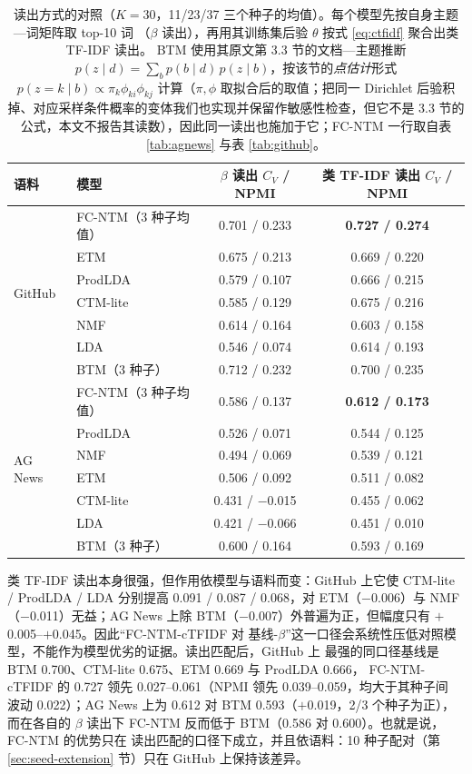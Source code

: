 \documentclass[11pt]{ctexart}
\newcommand{\fcntm}{FC-NTM}
\begin{document}
\begin{table}[t]
\centering
\caption{读出方式的对照（$K=30$，11/23/37 三个种子的均值）。每个模型先按自身主题—词矩阵取 top-10 词
（$\beta$ 读出），再用其训练集后验 $\theta$ 按式 \eqref{eq:ctfidf} 聚合出类 TF-IDF 读出。
BTM 使用其原文第 3.3 节的文档—主题推断
$p(z\mid d)=\sum_b p(b\mid d)\,p(z\mid b)$，按该节的\emph{点估计}形式
$p(z=k\mid b)\propto\pi_k\phi_{ki}\phi_{kj}$ 计算（$\pi,\phi$ 取拟合后的取值；把同一
Dirichlet 后验积掉、对应采样条件概率的变体我们也实现并保留作敏感性检查，但它不是 3.3 节的
公式，本文不报告其读数），因此同一读出也施加于它；\fcntm{} 一行取自表 \ref{tab:agnews}
与表 \ref{tab:github}。}
\label{tab:fair}
\footnotesize
\setlength{\tabcolsep}{4pt}
\begin{tabular}{@{}llcc@{}}
\toprule
语料 & 模型 & $\beta$ 读出 $C_V$ / NPMI & 类 TF-IDF 读出 $C_V$ / NPMI \\
\midrule
 \multirow{7}{*}{GitHub}
 & \fcntm{}（3 种子均值） & 0.701 / 0.233 & \textbf{0.727 / 0.274} \\
 & ETM & 0.675 / 0.213 & 0.669 / 0.220 \\
 & ProdLDA & 0.579 / 0.107 & 0.666 / 0.215 \\
 & CTM-lite & 0.585 / 0.129 & 0.675 / 0.216 \\
 & NMF & 0.614 / 0.164 & 0.603 / 0.158 \\
 & LDA & 0.546 / 0.074 & 0.614 / 0.193 \\
 & BTM（3 种子） & 0.712 / 0.232 & 0.700 / 0.235 \\
\midrule
 \multirow{7}{*}{AG News}
 & \fcntm{}（3 种子均值） & 0.586 / 0.137 & \textbf{0.612 / 0.173} \\
 & ProdLDA & 0.526 / 0.071 & 0.544 / 0.125 \\
 & NMF & 0.494 / 0.069 & 0.539 / 0.121 \\
 & ETM & 0.506 / 0.092 & 0.511 / 0.082 \\
 & CTM-lite & 0.431 / $-$0.015 & 0.455 / 0.062 \\
 & LDA & 0.421 / $-$0.066 & 0.451 / 0.010 \\
 & BTM（3 种子） & 0.600 / 0.164 & 0.593 / 0.169 \\
\bottomrule
\end{tabular}
\end{table}

类 TF-IDF 读出本身很强，但作用依模型与语料而变：GitHub 上它使 CTM-lite / ProdLDA / LDA
分别提高 0.091 / 0.087 / 0.068，对 ETM（$-$0.006）与 NMF（$-$0.011）无益；AG News 上除
BTM（$-$0.007）外普遍为正，但幅度只有 $+$0.005--$+$0.045。因此“\fcntm{}-cTFIDF 对
基线-$\beta$”这一口径会系统性压低对照模型，不能作为模型优劣的证据。读出匹配后，GitHub 上
最强的同口径基线是 BTM 0.700、CTM-lite 0.675、ETM 0.669 与 ProdLDA 0.666，
\fcntm{}-cTFIDF 的 0.727 领先 0.027--0.061（NPMI 领先 0.039--0.059，均大于其种子间
波动 0.022）；AG News 上为 0.612 对 BTM 0.593（$+$0.019，2/3 个种子为正），而在各自的
$\beta$ 读出下 \fcntm{} 反而低于 BTM（0.586 对 0.600）。也就是说，\fcntm{} 的优势只在
读出匹配的口径下成立，并且依语料：10 种子配对（第 \ref{sec:seed-extension} 节）只在
GitHub 上保持该差异。
\end{document}
